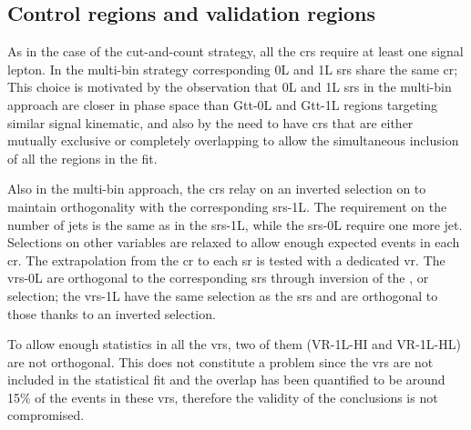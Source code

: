 \subsection{Control regions and validation regions}

As in the case of the cut-and-count strategy, all the \glspl{cr} require at least one signal lepton. 
In the multi-bin strategy corresponding 0L and 1L \glspl{sr} share the same \gls{cr};
This choice is motivated by the observation that 0L and 1L \glspl{sr} in the multi-bin approach are 
closer in phase space than Gtt-0L and Gtt-1L regions targeting similar signal kinematic, 
and also by the need to have \glspl{cr} that are either mutually exclusive or completely overlapping to 
allow the simultaneous inclusion of all the regions in the fit. 

Also in the multi-bin approach, the \glspl{cr} relay on an inverted selection on \mt to maintain orthogonality with 
the corresponding \glspl{sr}-1L. The requirement on the number of jets is the same as in the \glspl{sr}-1L, while the 
\glspl{sr}-0L require one more jet. Selections on other variables are relaxed to allow enough expected \ttbar events in 
each \gls{cr}.
The extrapolation from the \gls{cr} to each \gls{sr} is tested with a dedicated \gls{vr}. 
The \glspl{vr}-0L are orthogonal to the corresponding \glspl{sr} through inversion of the \mtb, \meff or \met selection;
the \glspl{vr}-1L have the same \mt selection as the \glspl{sr} and are orthogonal to those thanks to
an inverted \mtb selection.

To allow enough statistics in all the \glspl{vr}, two of them (VR-1L-HI and VR-1L-HL) are not orthogonal.
This does not constitute a problem since the \glspl{vr}
are not included in the statistical fit and 
the overlap has been quantified to be around 15\% of the events in these \glspl{vr}, therefore 
the validity of the conclusions is not compromised. 


